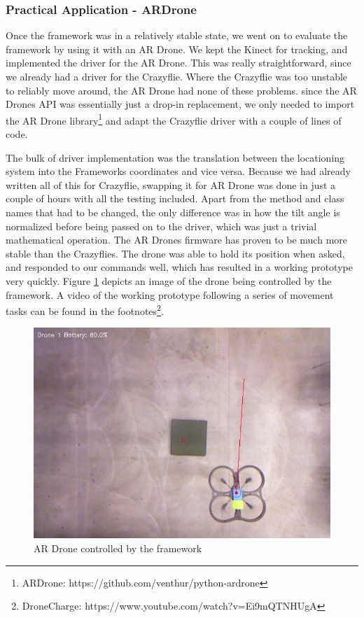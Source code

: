 \subsubsection{Practical Application - ARDrone}
Once the framework was in a relatively stable state, we went on to evaluate the framework by using it with an AR Drone. We kept the Kinect for tracking, and implemented the driver for the AR Drone. This was really straightforward, since we already had a driver for the Crazyflie. Where the Crazyflie was too unstable to reliably move around, the AR Drone had none of these problems. since the AR Drones API was essentially just a drop-in replacement, we only needed to import the AR Drone library\footnote{ARDrone: https://github.com/venthur/python-ardrone} and adapt the Crazyflie driver with a couple of lines of code.

The bulk of driver implementation was the translation between the locationing system into the Frameworks coordinates and vice versa. Because we had already written all of this for Crazyflie, swapping it for AR Drone was done in just a couple of hours with all the testing included. Apart from the method and class names that had to be changed, the only difference was in how the tilt angle is normalized before being passed on to the driver, which was just a trivial mathematical operation. The AR Drones firmware has proven to be much more stable than the Crazyflies. The drone was able to hold its position when asked, and responded to our commands well, which has resulted in a working prototype very quickly. Figure \ref{fig:ardrone} depicts an image of the drone being controlled by the framework. A video of the working prototype following a series of movement tasks can be found in the footnotes\footnote{DroneCharge: https://www.youtube.com/watch?v=Ei9mQTNHUgA}.

\begin{figure}[h]
\centering
\includegraphics[width=\columnwidth]{images/drone.png}
\caption{AR Drone controlled by the framework}
\label{fig:ardrone}
\end{figure}

